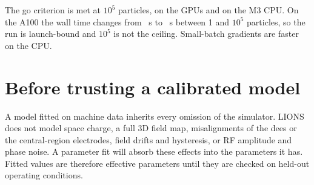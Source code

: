 \begin{reading}
The go criterion is met at $10^5$ particles, on the GPUs and on the M3 CPU.
On the A100 the wall time changes from \EtwoAWallOne{}~s to \EtwoAWallMax{}~s between 1 and $10^5$ particles, so the run is launch-bound and $10^5$ is not the
ceiling.
Small-batch gradients are faster on the CPU.
\end{reading}

\section{Before trusting a calibrated model}
A model fitted on machine data inherits every omission of the simulator.
LIONS does not model space charge, a full 3D field map, misalignments of the dees or the central-region electrodes,
field drifts and hysteresis, or RF amplitude and phase noise.
A parameter fit will absorb these effects into the parameters it has.
Fitted values are therefore effective parameters until they are checked on held-out operating conditions.
